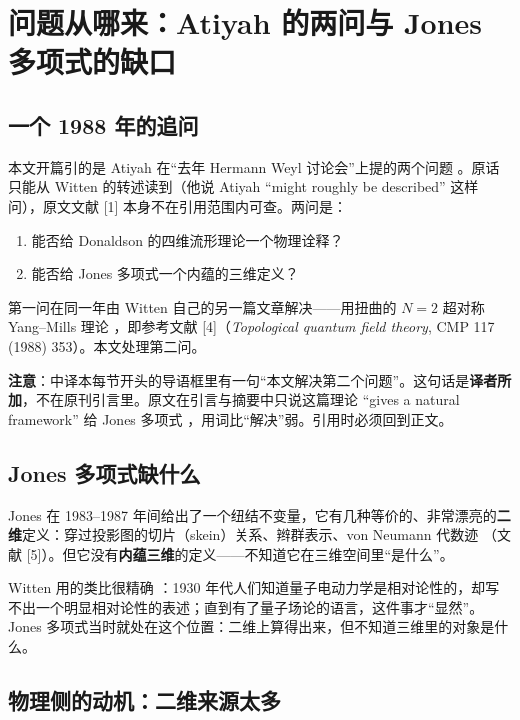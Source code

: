 \section{问题从哪来：Atiyah 的两问与 Jones 多项式的缺口}

\subsection{一个 1988 年的追问}

本文开篇引的是 Atiyah 在“去年 Hermann Weyl 讨论会”上提的两个问题 。原话只能从 Witten 的转述读到（他说 Atiyah “might roughly be described” 这样问），原文文献 [1] 本身不在引用范围内可查。两问是：

\begin{enumerate}[leftmargin=2em]
\item 能否给 Donaldson 的四维流形理论一个物理诠释？
\item 能否给 Jones 多项式一个内蕴的三维定义？
\end{enumerate}

第一问在同一年由 Witten 自己的另一篇文章解决——用扭曲的 $N=2$ 超对称 Yang--Mills 理论 ，即参考文献 [4]（\emph{Topological quantum field theory}, CMP 117 (1988) 353）。本文处理第二问。

\begin{keypoint}
\textbf{注意}：中译本每节开头的导语框里有一句“本文解决第二个问题”。这句话是\textbf{译者所加}，不在原刊引言里。原文在引言与摘要中只说这篇理论 “gives a natural framework” 给 Jones 多项式 ，用词比“解决”弱。引用时必须回到正文。
\end{keypoint}

\subsection{Jones 多项式缺什么}

Jones 在 1983--1987 年间给出了一个纽结不变量，它有几种等价的、非常漂亮的\textbf{二维}定义：穿过投影图的切片（skein）关系、辫群表示、von Neumann 代数迹 （文献 [5]）。但它没有\textbf{内蕴三维}的定义——不知道它在三维空间里“是什么”。

Witten 用的类比很精确 ：1930 年代人们知道量子电动力学是相对论性的，却写不出一个明显相对论性的表述；直到有了量子场论的语言，这件事才“显然”。Jones 多项式当时就处在这个位置：二维上算得出来，但不知道三维里的对象是什么。

\subsection{物理侧的动机：二维来源太多}

